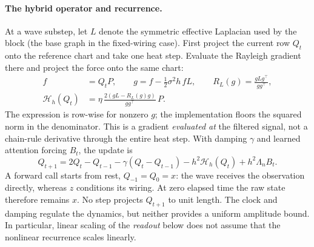 \documentclass[11pt,a4paper]{article}
\begin{document}
\paragraph{The hybrid operator and recurrence.}
At a wave substep, let $L$ denote the symmetric effective Laplacian used by
the block (the base graph in the fixed-wiring case). First project the
current row $Q_t$ onto the reference chart and take one heat step. Evaluate
the Rayleigh gradient there and project the force onto the same chart:
\begin{align}
 f&=Q_t P,\qquad g=f-\tfrac12\sigma^2h\,fL,\qquad
 R_L(g)=\frac{gLg^\top}{gg^\top}, \label{eq:heat}\\
 \mathcal H_h(Q_t)&=\eta\,\frac{2(gL-R_L(g)g)}{gg^\top}\,P .
 \label{eq:hybrid}
\end{align}
The expression is row-wise for nonzero $g$; the implementation floors the
squared norm in the denominator. This is a gradient \emph{evaluated at}
the filtered signal, not a chain-rule derivative through the entire heat
step. With damping $\gamma$ and learned attention forcing $B_t$, the update
is
\begin{equation}
 Q_{t+1}=2Q_t-Q_{t-1}-\gamma(Q_t-Q_{t-1})
          -h^2\mathcal H_h(Q_t)+h^2\Lambda_n B_t .
 \label{eq:wave}
\end{equation}
A forward call starts from rest, $Q_{-1}=Q_0=x$: the wave receives the
observation directly, whereas $z$ conditions its wiring. At zero elapsed time the
raw state therefore remains $x$. No step projects $Q_{t+1}$ to unit length.
The clock and damping regulate the dynamics, but neither provides a uniform
amplitude bound. In particular, linear scaling of the \emph{readout} below
does not assume that the nonlinear recurrence scales linearly.
\end{document}
